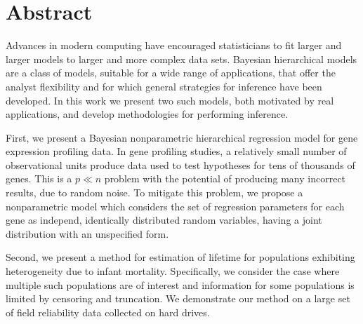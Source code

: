 \section*{Abstract}
Advances in modern computing have encouraged statisticians to fit larger and larger models to larger and more complex data sets. Bayesian hierarchical models are a class of models, suitable for a wide range of applications, that offer the analyst flexibility and for which general strategies for inference have been developed. In this work we present two such models, both motivated by real applications, and develop methodologies for performing inference.

First, we present a Bayesian nonparametric hierarchical regression model for gene expression profiling data. In gene profiling studies, a relatively small number of observational units produce data used to test hypotheses for tens of thousands of genes. This is a $p \ll n$ problem with the potential of producing many incorrect results, due to random noise. To mitigate this problem, we propose a nonparametric model which considers the set of regression parameters for each gene as independ, identically distributed random variables, having a joint distribution with an unspecified form.


Second, we present a method for estimation of lifetime for populations exhibiting heterogeneity due to infant mortality. Specifically, we consider the case where multiple such populations are of interest and information for some populations is limited by censoring and truncation. We demonstrate our method on a large set of field reliability data collected on hard drives.